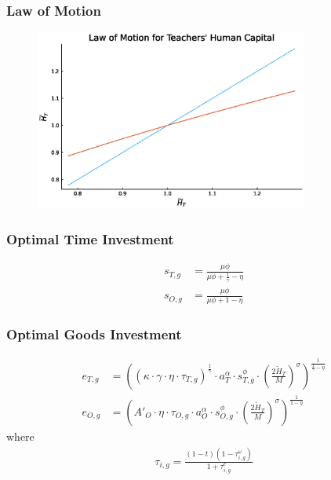 \documentclass[11pt]{beamer}
\begin{document}
\begin{frame}
\frametitle{Law of Motion}
\begin{figure}
\begin{center}
\includegraphics[width=0.8\textwidth]{plots/LoM.eps}
\label{ }
\end{center}
\end{figure}
\end{frame}

\begin{frame}
	\frametitle{Optimal Time Investment} 
	\label{time_inv}
	\begin{align}
		s_{T,g} & = \frac{\mu \phi}{\mu \phi+\tfrac{1}{\gamma}-\eta} \nonumber\\
		s_{O,g} & = \frac{\mu \phi}{\mu \phi+1-\eta} \nonumber
	\end{align}
	\hyperlink{eqm}{}
\end{frame}

\begin{frame}
	\frametitle{Optimal Goods Investment} 
	\label{good_inv}
	\begin{align}
		e_{T,g} & = \left( \left(\kappa \cdot \gamma \cdot \eta \cdot \tau_{T,g} \right)^\frac{1}{\gamma} \cdot a_T^{\alpha} \cdot s_{T,g}^{\phi} \cdot \left(\tfrac{2\widetilde{H}_T}{M}\right)^{\sigma}\right)^{\frac{1}{\frac{1}{\gamma}-\eta}}  \nonumber\\
		e_{O,g} & = \left( {{A'}_{O}} \cdot \eta \cdot\tau_{O,g} \cdot a_O^\alpha \cdot s_{O,g}^\phi \cdot  \left(\tfrac{2\widetilde{H}_T}{M}\right)^\sigma \right)^{\frac{1}{1-\eta}} \nonumber
	\end{align}
	where
	\begin{align}
		\tau_{i,g} =\frac{(1-t)(1-\tau^{\omega}_{i,g})}{1+\tau^e_{i,g}} \nonumber
	\end{align}
	\hyperlink{eqm}{}
\end{frame}
\end{document}
